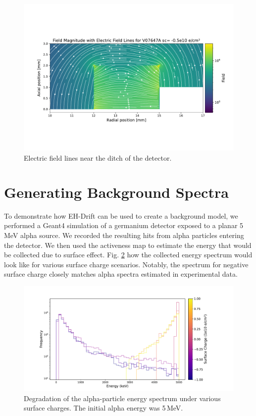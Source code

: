 \begin{figure}
\includegraphics[trim={0cm 4cm 0cm 4cm},clip,width=0.99\linewidth]{ch5/figs/elect_field_lines_surface_V07647A_sc_-0.5.pdf}
\caption{Electric field lines near the ditch of the detector.}
\label{ch5:fig:elect_field_lines_surface_V07647A}
\end{figure}
\section{\label{res:3} Generating Background Spectra}

To demonstrate how EH-Drift can be used to create a background model, we performed a Geant4 simulation of a germanium detector exposed to a planar 5\,MeV alpha source. We recorded the resulting hits from alpha particles entering the detector. We then used the activeness map to estimate the energy that would be collected due to surface effect. Fig. \ref{fig:eng_spec_degradation} how the collected energy spectrum would look like for various surface charge scenarios. Notably, the spectrum for negative surface charge closely matches alpha spectra estimated in experimental data.

\begin{figure}[!htb]
  \centering

  \includegraphics[trim={2cm 0.5cm 4.5cm 1.7cm},clip,width=0.99\linewidth]{ch5/figs/eng_deg_hist.pdf}
  \caption{Degradation of the alpha-particle energy spectrum under various surface charges. The initial alpha energy was 5\,MeV.}
  \label{fig:eng_spec_degradation}
\end{figure}


